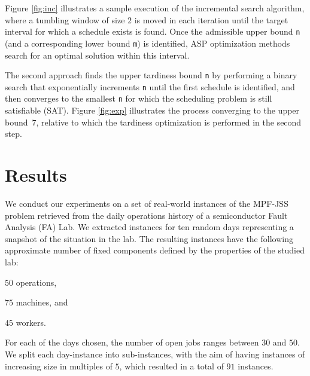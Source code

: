 \documentclass[submission,copyright,creativecommons]{eptcs}
\newcommand{\jss}{MPF-JSS\xspace}
\begin{document}
Figure \ref{fig:inc} illustrates a sample execution of the incremental search algorithm, where a tumbling window of size $2$ is moved in each iteration until the target interval for which a schedule exists is found. Once the admissible upper bound \lstinline{n} (and a corresponding lower bound \lstinline{m}) is identified, ASP optimization methods search for an optimal solution within this interval.

The second approach finds the upper tardiness bound \lstinline{n} by performing a binary search that exponentially increments \lstinline{n} until the first schedule is identified, and then converges to the smallest \lstinline{n} for which the scheduling problem is still satisfiable (SAT). Figure \ref{fig:exp} illustrates the process converging to the upper bound~$7$, relative to which the tardiness optimization is performed in the second step.

\section{Results}

We conduct our experiments on a set of real-world instances of the \jss problem retrieved from the daily operations history of a semiconductor Fault Analysis (FA) Lab.%
%
We extracted instances for ten random days representing a snapshot of the situation in the lab. The resulting instances have the following approximate number of fixed components defined by the properties of the studied lab:
\begin{enumerate*}[label=\emph{(\roman*)}]
	\item $50$ operations,
	\item $75$ machines, and 
	\item $45$ workers.
\end{enumerate*}
For each of the days chosen, the number of open jobs ranges between $30$ and $50$. We split each day-instance into sub-instances, with the aim of having instances of increasing size in multiples of $5$, which resulted in a total of $91$ instances.
\end{document}
